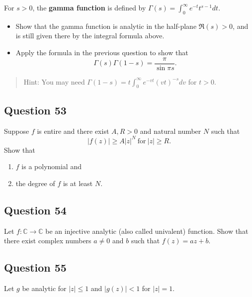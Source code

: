 \documentclass[12pt]{article}
\begin{document}
For \(s>0\), the \textbf{gamma function} is defined by
\(\displaystyle{\Gamma(s)=\int_0^{\infty} e^{-t}t^{s-1} dt}\).

\begin{itemize}
\item
  Show that the gamma function is analytic in the half-plane
  \(\Re (s)>0\), and is still given there by the integral formula above.
\item
  Apply the formula in the previous question to show that
  \[\Gamma(s)\Gamma(1-s)=\frac{\pi}{\sin \pi s}.\]
\end{itemize}

\begin{quote}
Hint: You may need
\(\displaystyle{\Gamma(1-s)=t \int_0^{\infty}e^{-vt}(vt)^{-s} dv}\) for
\(t>0\).
\end{quote}

\hypertarget{question-53-2}{%
\subsection{Question 53}\label{question-53-2}}

Suppose \(f\) is entire and there exist \(A, R >0\) and natural number
\(N\) such that \[|f(z)| \geq A |z|^N\ \text{for}\ |z| \geq R.\] Show
that

\begin{enumerate}
\def\labelenumi{(\roman{enumi})}
\item
  \(f\) is a polynomial and
\item
  the degree of \(f\) is at least \(N\).
\end{enumerate}

\hypertarget{question-54-2}{%
\subsection{Question 54}\label{question-54-2}}

Let \(f: {\mathbb C} \rightarrow {\mathbb C}\) be an injective analytic
(also called univalent) function. Show that there exist complex numbers
\(a \neq 0\) and \(b\) such that \(f(z) = az + b\).

\hypertarget{question-55-2}{%
\subsection{Question 55}\label{question-55-2}}

Let \(g\) be analytic for \(|z|\leq 1\) and \(|g(z)| < 1\) for
\(|z| = 1\).
\end{document}
